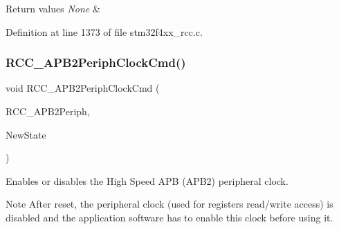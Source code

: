 \begin{DoxyRetVals}{Return values}
{\em None} & \\
\hline
\end{DoxyRetVals}


Definition at line 1373 of file stm32f4xx\+\_\+rcc.\+c.

\mbox{\label{group___r_c_c___group3_ga56ff55caf8d835351916b40dd030bc87}} 
\subsubsection{\texorpdfstring{R\+C\+C\+\_\+\+A\+P\+B2\+Periph\+Clock\+Cmd()}{RCC\_APB2PeriphClockCmd()}}
{\footnotesize\ttfamily void R\+C\+C\+\_\+\+A\+P\+B2\+Periph\+Clock\+Cmd (\begin{DoxyParamCaption}\item[{uint32\+\_\+t}]{R\+C\+C\+\_\+\+A\+P\+B2\+Periph,  }\item[{Functional\+State}]{New\+State }\end{DoxyParamCaption})}



Enables or disables the High Speed A\+PB (A\+P\+B2) peripheral clock. 

\begin{DoxyNote}{Note}
After reset, the peripheral clock (used for registers read/write access) is disabled and the application software has to enable this clock before using it. 
\end{DoxyNote}

